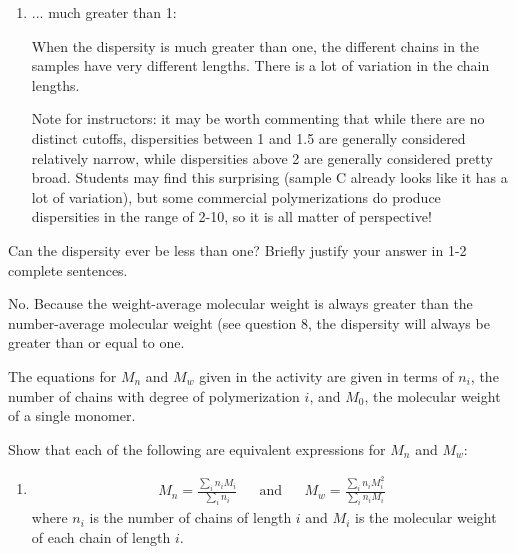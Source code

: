 \begin{activity}
\begin{ctqs}
\begin{enumerate}
			\item ... much greater than 1:
			
				\begin{solution}[1in]
					When the dispersity is much greater than one, the different chains in the samples have very different lengths.  There is a lot of variation in the chain lengths.
					
					Note for instructors: it may be worth commenting that while there are no distinct cutoffs, dispersities between 1 and 1.5 are generally considered relatively narrow, while dispersities above 2 are generally considered pretty broad.  Students may find this surprising (sample C already looks like it has a lot of variation), but some commercial polymerizations do produce dispersities in the range of 2-10, so it is all matter of perspective!
				\end{solution}
			
		\end{enumerate}
		
	\question Can the dispersity ever be less than one?  Briefly justify your answer in 1-2 complete sentences.
	
		\begin{solution}[2in]
			No. Because the weight-average molecular weight is always greater than the number-average molecular weight (see question 8, %
			the dispersity will always be greater than or equal to one.
		\end{solution}
	
\end{ctqs}



\begin{exercises}

		\exercise The equations for $M_n$ and $M_w$ given in the activity are given in terms of $n_i$, the number of chains with degree of polymerization $i$, and $M_0$, the molecular weight of a single monomer.
		
		Show that each of the following are equivalent expressions for $M_n$ and $M_w$:
		
			\begin{enumerate}
				
				\item \begin{align*}
					M_n = \frac{\sum_i n_i M_i}{\sum_i n_i} && \text{and} &&  M_w = \frac{\sum_i n_i M_i^2}{\sum_i n_i M_i}
				\end{align*}
					where $n_i$ is the number of chains of length $i$ and $M_i$ is the molecular weight of each chain of length $i$.
					

\end{enumerate}
\end{exercises}
\end{activity}
